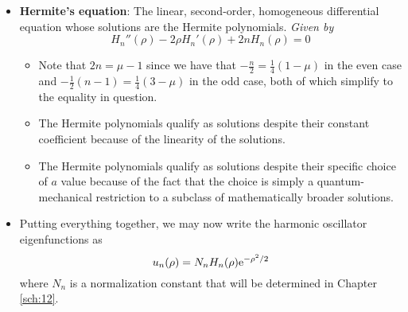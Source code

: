 \documentclass[../finalProject.tex]{subfiles}
\begin{document}
\begin{itemize}
\begin{itemize}
    \end{itemize}
    \item \textbf{Hermite's equation}: The linear, second-order, homogeneous differential equation whose solutions are the Hermite polynomials. \emph{Given by}
    \begin{equation*}
        H_n''(\rho)-2\rho H_n'(\rho)+2nH_n(\rho) = 0
    \end{equation*}
    \begin{itemize}
        \item Note that $2n=\mu-1$ since we have that $-\frac{n}{2}=\tfrac{1}{4}(1-\mu)$ in the even case and $-\tfrac{1}{2}(n-1)=\tfrac{1}{4}(3-\mu)$ in the odd case, both of which simplify to the equality in question.
        \item The Hermite polynomials qualify as solutions despite their constant coefficient because of the linearity of the solutions.
        \item The Hermite polynomials qualify as solutions despite their specific choice of $a$ value because of the fact that the choice is simply a quantum-mechanical restriction to a subclass of mathematically broader solutions.
    \end{itemize}
    \item Putting everything together, we may now write the harmonic oscillator eigenfunctions as
    \begin{equation*}
        u_n(\rho) = N_nH_n(\rho)\e[-\rho^2/2]
    \end{equation*}
    where $N_n$ is a normalization constant that will be determined in Chapter \ref{sch:12}.
\end{itemize}
\end{document}
